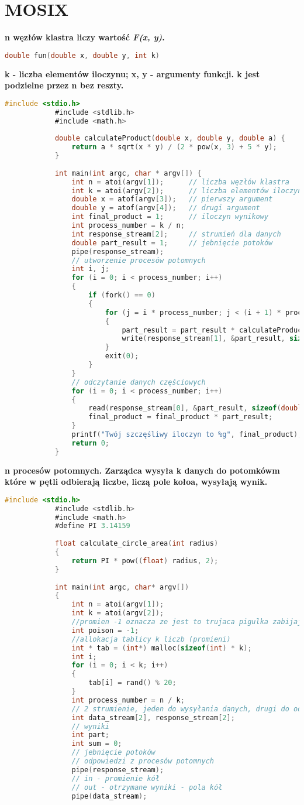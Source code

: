 \section{MOSIX}
		\textbf{n węzłów klastra liczy wartość \textit{F(x, y)}.}
		\begin{lstlisting}[language=C]
			double fun(double x, double y, int k)
		\end{lstlisting}
		\textbf{k - liczba elementów iloczynu; x, y - argumenty funkcji. k jest podzielne przez n bez reszty.}
		\begin{lstlisting}[language=C]
			#include <stdio.h>
			#include <stdlib.h>
			#include <math.h>
			
			double calculateProduct(double x, double y, double a) {
				return a * sqrt(x * y) / (2 * pow(x, 3) + 5 * y);
			}
			
			int main(int argc, char * argv[]) {
				int n = atoi(argv[1]);		// liczba węzłów klastra
				int k = atoi(argv[2]);		// liczba elementów iloczynu
				double x = atof(argv[3]);	// pierwszy argument
				double y = atof(argv[4]);	// drugi argument
				int final_product = 1;		// iloczyn wynikowy
				int process_number = k / n;
				int response_stream[2];		// strumień dla danych
				double part_result = 1;		// jebnięcie potoków
				pipe(response_stream);
				// utworzenie procesów potomnych
				int i, j;
				for (i = 0; i < process_number; i++)
				{
					if (fork() == 0)
					{
						for (j = i * process_number; j < (i + 1) * process_number; j++)
						{
							part_result = part_result * calculateProduct(x, y, j);
							write(response_stream[1], &part_result, sizeof(double));
						}
						exit(0);
					}
				}
				// odczytanie danych częściowych
				for (i = 0; i < process_number; i++)
				{
					read(response_stream[0], &part_result, sizeof(double));
					final_product = final_product * part_result;
				}
				printf("Twój szczęśliwy iloczyn to %g", final_product);
				return 0;
			}
		\end{lstlisting}
			\textbf{n procesów potomnych. Zarządca wysyła k danych do potomkówm które w pętli odbierają liczbe, liczą pole kołoa, wysyłają wynik.}
			\begin{lstlisting}[language=C]
			#include <stdio.h>
			#include <stdlib.h>
			#include <math.h>
			#define PI 3.14159
			
			float calculate_circle_area(int radius)
			{
				return PI * pow((float) radius, 2);
			}
			
			int main(int argc, char* argv[])
			{
				int n = atoi(argv[1]);
				int k = atoi(argv[2]);
				//promien -1 oznacza ze jest to trujaca pigulka zabijajaca proces potomny
				int poison = -1;		
				//allokacja tablicy k liczb (promieni)
				int * tab = (int*) malloc(sizeof(int) * k);
				int i;
				for (i = 0; i < k; i++)
				{
					tab[i] = rand() % 20;
				}
				int process_number = n / k;
				// 2 strumienie, jeden do wysyłania danych, drugi do odbioru odpowiedzi
				int data_stream[2], response_stream[2];
				// wyniki
				int part;
				int sum = 0;
				// jebnięcie potoków
				// odpowiedzi z procesów potomnych
				pipe(response_stream);
				// in - promienie kół
				// out - otrzymane wyniki - pola kół
				pipe(data_stream);
			\end{lstlisting}

